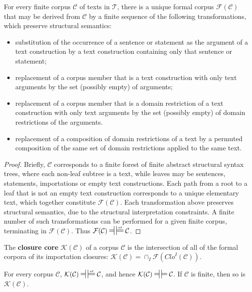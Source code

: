 \documentclass{IOS-Book-Article}
\newcommand{\corp}{ \mathcal{C} }
\newcommand{\texts}{ \mathcal{T} }
\newcommand{\Formal}{\mathcal{F}}
\newcommand{\Core}{\mathcal{K}}
\newcommand{\Clo}{\mathit{Clo}}
\newcommand{\mdpfEquiv}{\ensuremath{\ndststile[ss]{\hspace*{3 pt }}{}\hspace*{3 pt}\sdtstile[ss]{}{}}}
\newcommand{\mdpfstructEquiv}{\ensuremath{\ndststile[ss]{\hspace*{3 pt }}{}\hspace*{3 pt}\sdtstile[ss]{}{st}}}
\begin{document}
\begin{theo}
\label{formal}
For every finite corpus $\corp$ of texts in $\texts$, there is a unique formal corpus $\Formal(\corp)$ that may be derived from $\corp$ by a finite sequence of the following transformations, which preserve structural semantics:
\begin{itemize}
\item substitution of the occurrence of a sentence or statement as the argument of a text construction by a text construction containing only that sentence or statement;
\item replacement of a corpus member that is a text construction with only text arguments by the set (possibly empty) of arguments;
\item replacement of a corpus member that is a domain restriction of a text construction with only text arguments by the set (possibly empty) of domain restrictions of the arguments.
\item replacement of a composition of domain restrictions of a text by a permuted composition of the same set of domain restrictions applied to the same text.
\end{itemize}
\begin{proof} Briefly, $\corp$ corresponds to a finite forest of finite abstract structural syntax trees, where each non-leaf subtree is a text, while leaves may be sentences, statements, importations or empty text constructions. Each path from a root to a leaf that is not an empty text construction corresponds to a unique elementary text, which together constitute $\Formal(\corp)$. Each transformation above preserves structural semantics, due to the structural interpretation constraints. A finite number of such transformations can be performed for a given finite corpus, terminating in $\Formal(\corp)$. Thus $\Formal(\corp)\mdpfstructEquiv\corp$.
\end{proof}
\end{theo}

\noindent The \textbf{closure core} $\Core(\corp)$ of a corpus $\corp$ is the intersection of all of the formal corpora of its importation closures: $\Core(\corp)= \cap_I \Formal(\Clo^I(\corp))$.

\begin{theo}
\label{core}
For every corpus $\corp$, $\Core(\corp)\mdpfstructEquiv\corp$, and hence $\Core(\corp)\mdpfEquiv\corp$.
If $\corp$ is finite, then so is $\Core(\corp)$.
\end{theo}
\end{document}
